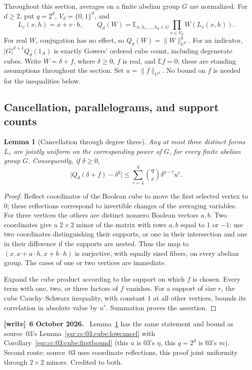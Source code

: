 \documentclass[11pt,letterpaper]{article}
\numberwithin{equation}{section}
\newtheorem{lemma}[theorem]{Lemma}
\theoremstyle{definition}
\theoremstyle{remark}
\newcommand{\1}{\mathbf 1}
\newenvironment{writenote}[1][]{\par\smallskip\begingroup\small
 \noindent\textbf{[write]}\if\relax\detokenize{#1}\relax\else~\textbf{#1.}\fi\ }%
 {\par\endgroup\smallskip}
\begin{document}
Throughout this section, averages on a finite abelian group $G$ are normalized.
For $d\geq2$, put $q=2^d$, $V_d=\{0,1\}^d$, and
\[
 L_v(x,h)=x+v\cdot h,\qquad
 Q_d(W)=\mathbb E_{x,h_1,\ldots,h_d\in G}
                  \prod_{v\in V_d}W(L_v(x,h)).
\]
For real $W$, conjugation has no effect, so
$Q_d(W)=\|W\|_{U^d}^{q}$. For an indicator, $|G|^{d+1}Q_d(1_A)$ is
exactly Gowers' ordered cube count, including degenerate cubes. Write
$W=\delta+f$, where $\delta\geq0$, $f$ is real, and $\mathbb E f=0$;
these are standing assumptions throughout the section. Set
$u=\|f\|_{U^d}$. No bound on $f$ is needed for the inequalities below.

\subsection{Cancellation, parallelograms, and support counts}

\begin{lemma}[Cancellation through degree three]
\label{gsr:cc:04:cub:low-cancellation}
Any at most three distinct forms $L_v$ are jointly uniform on the
corresponding power of $G$, for every finite abelian group $G$. Consequently,
if $\delta\geq0$,
\begin{equation}
 \bigl|Q_d(\delta+f)-\delta^q\bigr|
 \leq \sum_{r=4}^{q}\binom qr\delta^{q-r}u^r.
 \label{gsr:cc:04:cub:universal-fourth}
\end{equation}
\end{lemma}

\begin{proof}
Reflect coordinates of the Boolean cube to move the first selected vertex
to $0$; these reflections correspond to invertible changes of the averaging
variables. For three vertices the others are distinct nonzero Boolean
vectors $a,b$. Two coordinates give a $2\times2$ minor of the matrix with
rows $a,b$ equal to $1$ or $-1$: use two coordinates distinguishing their
supports, or one in their intersection and one in their difference if the
supports are nested. Thus the map to $(x,x+a\cdot h,x+b\cdot h)$ is
surjective, with equally sized fibers, on every abelian group. The cases of
one or two vertices are immediate.

Expand the cube product according to the support on which $f$ is chosen.
Every term with one, two, or three factors of $f$ vanishes. For a support
of size $r$, the cube Cauchy--Schwarz inequality, with constant $1$ at all
other vertices, bounds its correlation in absolute value by $u^r$.
Summation proves the assertion.
\end{proof}
\begin{writenote}[6 October 2026]
Lemma~\ref{gsr:cc:04:cub:low-cancellation} has the same statement and bound as source~03's Lemma~\ref{gsr:cc:03:cube:lowcancel} with Corollary~\ref{gsr:cc:03:cube:firstbound} (this $u$ is 03's $\eta$, this $q=2^d$ is 03's $m$). Second route: source~03 uses coordinate reflections, this proof joint uniformity through $2\times2$ minors. Credited to both.
\end{writenote}
\end{document}

